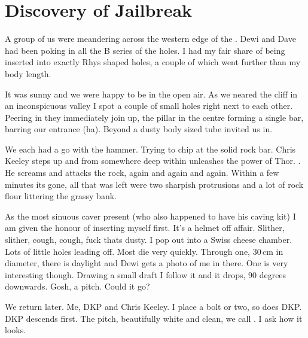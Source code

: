 \section{Discovery of Jailbreak}

 
A group of us were meandering across the western edge of the . Dewi and Dave had been poking in all the B series of the holes. I had my fair share of being inserted into exactly Rhys shaped holes, a couple of which went further than my body length.
 
It was sunny and we were happy to be in the open air. As we neared the cliff in an inconspicuous valley I spot a couple of small holes right next to each other. Peering in they immediately join up, the pillar in the centre forming a single bar, barring our entrance (ha). Beyond a dusty body sized tube invited us in. 

We each had a go with the hammer. Trying to chip at the solid rock bar. Chris Keeley steps up and from somewhere deep within unleashes the power of Thor. . He screams and attacks the rock, again and again and again. Within a few minutes its gone, all that was left were two sharpish protrusions and a lot of rock flour littering the grassy bank. 
 
As the most sinuous caver present (who also happened to have his caving kit) I am given the honour of inserting myself first. It's a helmet off affair. Slither, slither, cough, cough, fuck thats dusty. I pop out into a Swiss cheese chamber. Lots of little holes leading off. Most die very quickly. Through one, 30\,cm in diameter, there is daylight and Dewi gets a photo of me in there. One is very interesting though. Drawing a small draft I follow it and it drops, 90 degrees downwards. Gosh, a pitch. Could it go?
 
We return later. Me, DKP and Chris Keeley. I place a bolt or two, so does DKP. DKP descends first. The pitch, beautifully white and clean, we call . I ask how it looks. 

